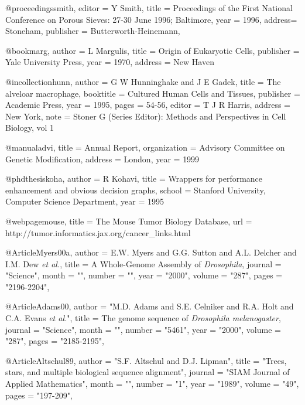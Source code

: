 %
@proceedings{smith,
	editor  = {Y Smith}, 
	title   = {Proceedings of the First National Conference
		   on Porous Sieves: 27-30 June 1996; Baltimore},
	year = 1996,
	  address= {Stoneham}, 
	  publisher = {Butterworth-Heinemann},
}	


%
@book{marg,
	author    = {L Margulis}, 
	title     = {Origin of Eukaryotic Cells},
	publisher = {Yale University Press}, 
	year      = {1970},
	address   = {New Haven} 
}



%
@incollection{hunn,
	author    = {G W Hunninghake and J E Gadek}, 
	title     = {The alveloar macrophage},
	booktitle = {Cultured Human Cells and Tissues},
	publisher = {Academic Press}, 
	year      = {1995},
  pages      = {54-56},
	  editor   = {T J R Harris}, 
	  address  = {New York}, 
	  note     = {Stoner G (Series Editor): Methods and Perspectives in Cell Biology, vol 1} 
}


@manual{advi,
	  title   = {Annual Report}, 
	    organization  = {Advisory Committee on Genetic Modification}, 
	    address = {London},
	    year    = {1999}
}


%
@phdthesis{koha,
	author = {R Kohavi}, 
	title  = {Wrappers for performance enhancement and
		  obvious decision graphs},
	school = {Stanford University, Computer Science Department},
	year   = {1995}
}

%
@webpage{mouse,
	title  = {The Mouse Tumor Biology Database},
	url = {http://tumor.informatics.jax.org/cancer_links.html}
}



@Article{Myers00a,
   author =   {E.W. Myers and G.G. Sutton and A.L. Delcher and I.M. Dew {\it et al.}},
   title =   {{A Whole-Genome Assembly of {\it Drosophila}}},
   journal =   "Science",
   month = "",
   number = "",
   year =   "2000",
   volume =   "287",
   pages =   "2196-2204",
}

@Article{Adams00,
   author =   "M.D. Adams and S.E. Celniker and R.A. Holt and C.A. Evans {\it et al.}",
   title =   {{The genome sequence of {\it Drosophila melanogaster}}},
   journal =   "Science",
   month = "",
   number = "5461",
   year =   "2000",
   volume =   "287",
   pages =   "2185-2195",
}


@Article{Altschul89,
   author =   "S.F. Altschul and D.J. Lipman",
   title =   "Trees, stars, and multiple biological sequence alignment",
   journal =   "SIAM Journal of Applied Mathematics",
   month = "",
   number = "1",
   year =   "1989",
   volume =   "49",
   pages =   "197-209",
}

